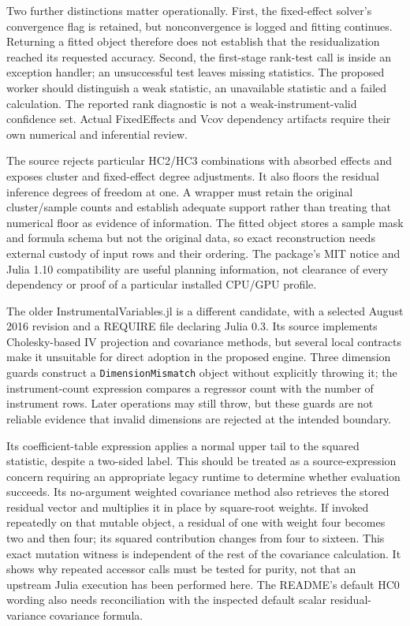 Two further distinctions matter operationally. First, the fixed-effect
solver's convergence flag is retained, but nonconvergence is logged and
fitting continues. Returning a fitted object therefore does not establish
that the residualization reached its requested accuracy. Second, the
first-stage rank-test call is inside an exception handler; an unsuccessful
test leaves missing statistics. The proposed worker should distinguish a
weak statistic, an unavailable statistic and a failed calculation. The
reported rank diagnostic is not a weak-instrument-valid confidence set.
Actual FixedEffects and Vcov dependency artifacts require their own
numerical and inferential review.
\citep{exec23_otheriv_source_0}

The source rejects particular HC2/HC3 combinations with absorbed effects
and exposes cluster and fixed-effect degree adjustments. It also floors
the residual inference degrees of freedom at one. A wrapper must retain
the original cluster/sample counts and establish adequate support rather
than treating that numerical floor as evidence of information. The fitted
object stores a sample mask and formula schema but not the original data,
so exact reconstruction needs external custody of input rows and their
ordering. The package's MIT notice and Julia 1.10 compatibility are useful
planning information, not clearance of every dependency or proof of a
particular installed CPU/GPU profile.
\citep{exec23_otheriv_source_0}

The older InstrumentalVariables.jl is a different candidate, with a
selected August 2016 revision and a REQUIRE file declaring Julia 0.3. Its
source implements Cholesky-based IV projection and covariance methods,
but several local contracts make it unsuitable for direct adoption in
the proposed engine. Three dimension guards construct a
\texttt{DimensionMismatch} object without explicitly throwing it; the
instrument-count expression compares a regressor count with the number
of instrument rows. Later operations may still throw, but these guards
are not reliable evidence that invalid dimensions are rejected at the
intended boundary.
\citep{exec23_otheriv_source_2}

Its coefficient-table expression applies a normal upper tail to the
squared statistic, despite a two-sided label. This should be treated as
a source-expression concern requiring an appropriate legacy runtime to
determine whether evaluation succeeds. Its no-argument weighted covariance
method also retrieves the stored residual vector and multiplies it in
place by square-root weights. If invoked repeatedly on that mutable
object, a residual of one with weight four becomes two and then four; its
squared contribution changes from four to sixteen. This exact mutation
witness is independent of the rest of the covariance calculation. It
shows why repeated accessor calls must be tested for purity, not that an
upstream Julia execution has been performed here. The README's default
HC0 wording also needs reconciliation with the inspected default scalar
residual-variance covariance formula.
\citep{exec23_otheriv_source_2,exec23_otheriv_reference}

